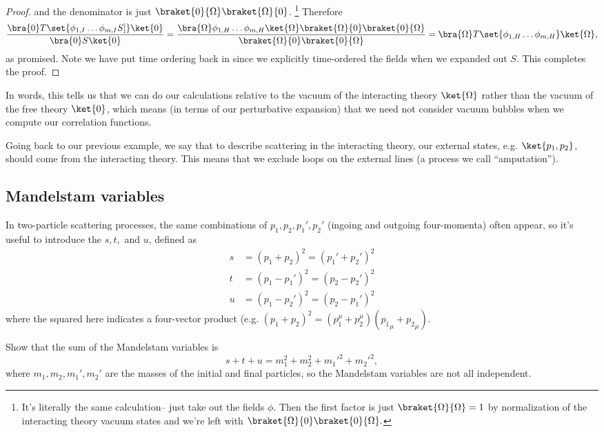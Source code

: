 \begin{proof}
and the denominator is just $\braket{0}{\Omega}\braket{\Omega}{0}$.%
    \footnote{It's literally the same calculation-- just take out the fields $\phi$. Then the first factor is just $\braket{\Omega}{\Omega}=1$ by normalization of the interacting theory vacuum states and we're left with $\braket{\Omega}{0}\braket{0}{\Omega}.$}
%
Therefore
$$\frac{\bra{0}T \set{\phi_{1,I}\ldots \phi_{m,I}S]}\ket{0}}{\bra{0}S\ket{0}}=\frac{\bra{\Omega}\phi_{1,H}\ldots \phi_{m,H}\ket{\Omega}\braket{\Omega}{0}\braket{0}{\Omega}}{\braket{\Omega}{0}\braket{0}{\Omega}}=\bra{\Omega}T\set{\phi_{1,H}\ldots \phi_{m,H}}\ket{\Omega},
$$
as promised. Note we have put time ordering back in since we explicitly time-ordered the fields when we expanded out $S$. This completes the proof.
\end{proof}

In words, this tells us that we can do our calculations relative to the vacuum of the interacting theory $\ket{\Omega}$ rather than the vacuum of the free theory $\ket{0}$, which means (in terms of our perturbative expansion) that we need not consider vacuum bubbles when we compute our correlation functions.

Going back to our previous example, we say that to describe scattering in the interacting theory, our external states, e.g. $\ket{p_1,p_2}$, should come from the interacting theory. This means that we exclude loops on the external lines (a process we call ``amputation'').

\subsection*{Mandelstam variables} In two-particle scattering processes, the same combinations of $p_1,p_2,p_1',p_2'$ (ingoing and outgoing four-momenta) often appear, so it's useful to introduce the  $s,t,$ and $u$, defined as
\begin{align*}
s&=(p_1+p_2)^2=(p_1'+p_2')^2\\
t&=(p_1-p_1')^2=(p_2-p_2')^2\\
u&=(p_1-p_2')^2=(p_2-p_1')^2
\end{align*}
where the squared here indicates a four-vector product (e.g. $(p_1+p_2)^2=(p_1^\mu+p_2^\mu)({p_1}_\mu+{p_2}_\mu).$
\begin{ex}
Show that the sum of the Mandelstam variables is
$$s+t+u=m_1^2+m_2^2+{m_1'}^2+{m_2'}^2,$$
where $m_1,m_2,m_1',m_2'$ are the masses of the initial and final particles, so the Mandelstam variables are not all independent.
\end{ex}

